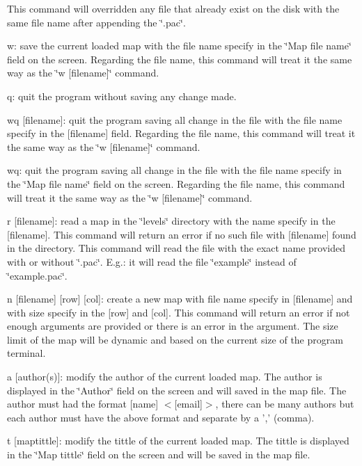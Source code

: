 \begin{DoxyEnumerate}
This command will overridden any file that already exist on the disk with the same file name after appending the \char`\"{}.\-pac\char`\"{}.

w\-: save the current loaded map with the file name specify in the \char`\"{}\-Map
      file name\char`\"{} field on the screen. Regarding the file name, this command will treat it the same way as the \char`\"{}w \mbox{[}filename\mbox{]}\char`\"{} command.

q\-: quit the program without saving any change made.

wq \mbox{[}filename\mbox{]}\-: quit the program saving all change in the file with the file name specify in the \mbox{[}filename\mbox{]} field. Regarding the file name, this command will treat it the same way as the \char`\"{}w \mbox{[}filename\mbox{]}\char`\"{} command.

wq\-: quit the program saving all change in the file with the file name specify in the \char`\"{}\-Map file name\char`\"{} field on the screen. Regarding the file name, this command will treat it the same way as the \char`\"{}w \mbox{[}filename\mbox{]}\char`\"{} command.

r \mbox{[}filename\mbox{]}\-: read a map in the \char`\"{}levels\char`\"{} directory with the name specify in the \mbox{[}filename\mbox{]}. This command will return an error if no such file with \mbox{[}filename\mbox{]} found in the directory. This command will read the file with the exact name provided with or without \char`\"{}.\-pac\char`\"{}. E.\-g.\-: it will read the file \char`\"{}example\char`\"{} instead of \char`\"{}example.\-pac\char`\"{}.

n \mbox{[}filename\mbox{]} \mbox{[}row\mbox{]} \mbox{[}col\mbox{]}\-: create a new map with file name specify in \mbox{[}filename\mbox{]} and with size specify in the \mbox{[}row\mbox{]} and \mbox{[}col\mbox{]}. This command will return an error if not enough arguments are provided or there is an error in the argument. The size limit of the map will be dynamic and based on the current size of the program terminal.

a \mbox{[}author(s)\mbox{]}\-: modify the author of the current loaded map. The author is displayed in the \char`\"{}\-Author\char`\"{} field on the screen and will saved in the map file. The author must had the format \mbox{[}name\mbox{]} $<$\mbox{[}email\mbox{]}$>$, there can be many authors but each author must have the above format and separate by a ',' (comma).

t \mbox{[}maptittle\mbox{]}\-: modify the tittle of the current loaded map. The tittle is displayed in the \char`\"{}\-Map tittle\char`\"{} field on the screen and will be saved in the map file.


\end{DoxyEnumerate}

